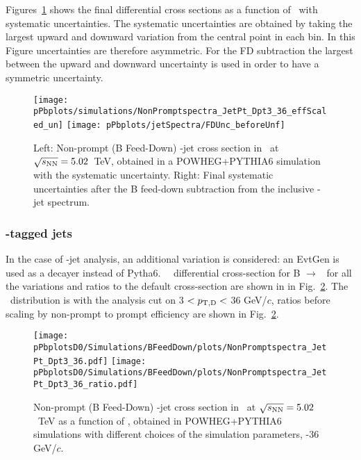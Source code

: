 Figures~\ref{fig:BFeedDown_GeneratorLevel_Spectrum_canvas} shows the final differential cross sections as a function of \ptchjet\ with systematic uncertainties. The systematic uncertainties are obtained by taking the largest upward and downward variation from the central point in each bin. In this Figure uncertainties are therefore asymmetric. For the FD subtraction the largest between the upward and downward uncertainty is used in order to have a symmetric uncertainty.

\begin{figure}[bth]
\begin{center}
\texttt{[image: pPbplots/simulations/NonPromptspectra\_JetPt\_Dpt3\_36\_effScaled\_un]}
\texttt{[image: pPbplots/jetSpectra/FDUnc\_beforeUnf]}
\caption{Left: Non-prompt (B Feed-Down) \Dstar-jet cross section in \pPb\ at $\sqrt{s_{\rm NN}}=5.02$~TeV, obtained in a POWHEG+PYTHIA6 simulation with the systematic uncertainty. Right: Final systematic uncertainties after the B feed-down subtraction from the inclusive \Dstar-jet spectrum. } 
\label{fig:BFeedDown_GeneratorLevel_Spectrum_canvas}
\end{center}
\end{figure}

\subsubsection{\Dzero-tagged jets}

In the case of \Dzero-jet analysis, an additional variation is considered: an EvtGen is used as a decayer instead of Pytha6. \ptchjet\ \pt\ differential cross-section for B $\rightarrow$ \Dzero\ for all the variations and ratios to the default cross-section are shown in  in Fig.~\ref{fig:BFeedDown_JetPtSpectrum_Dzero}.
The \ptchjet\ distribution is with the analysis cut on 3 $< p_{\mathrm{T,D}} <$ 36 GeV/$c$, ratios before scaling by non-prompt to prompt efficiency are shown in Fig.~\ref{fig:BFeedDown_JetPtSpectrum_Dzero}.


\begin{figure}[bth]
\begin{center}
\texttt{[image: pPbplotsD0/Simulations/BFeedDown/plots/NonPromptspectra\_JetPt\_Dpt3\_36.pdf]}
\texttt{[image: pPbplotsD0/Simulations/BFeedDown/plots/NonPromptspectra\_JetPt\_Dpt3\_36\_ratio.pdf]}
\caption{Non-prompt (B Feed-Down) \Dzero-jet cross section in \pPb\ at $\sqrt{s_{\rm NN}}=5.02$~TeV as a function of \ptchjet, obtained in POWHEG+PYTHIA6 simulations
with different choices of the simulation parameters, \ptd{}-36 GeV/$c$.} 
\label{fig:BFeedDown_JetPtSpectrum_Dzero}
\end{center}
\end{figure}

